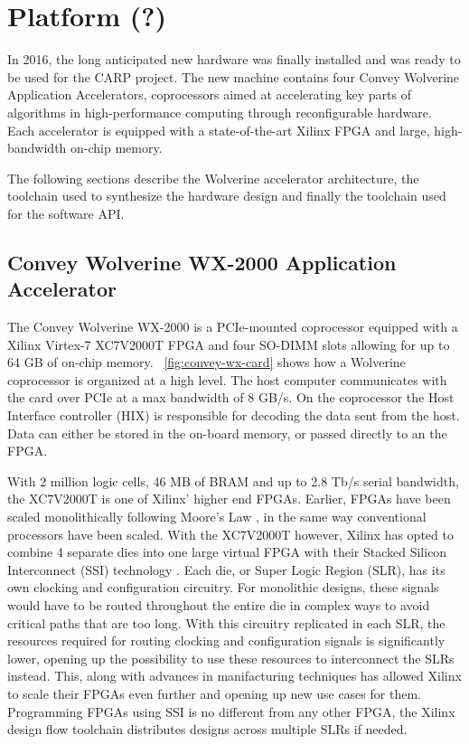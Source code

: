 
\chapter{Platform (?)}

In 2016, the long anticipated new hardware was finally installed and was ready
to be used for the CARP project. The new machine contains four Convey Wolverine
Application Accelerators, coprocessors aimed at accelerating key parts of
algorithms in high-performance computing through reconfigurable hardware. Each
accelerator is equipped with a state-of-the-art Xilinx FPGA and large,
high-bandwidth on-chip memory.

The following sections describe the Wolverine accelerator architecture, the
toolchain used to synthesize the hardware design and finally the toolchain used
for the software API.

\section{Convey Wolverine WX-2000 Application Accelerator}

The Convey Wolverine WX-2000 is a PCIe-mounted coprocessor equipped with a
Xilinx Virtex-7 XC7V2000T FPGA and four SO-DIMM slots allowing for up to 64 GB
of on-chip memory. \figurename~\ref{fig:convey-wx-card} shows how a Wolverine
coprocessor is organized at a high level. The host computer communicates with
the card over PCIe at a max bandwidth of 8 GB/s. On the coprocessor the Host
Interface controller (HIX) is responsible for decoding the data sent from the
host. Data can either be stored in the on-board memory, or passed directly to an
the FPGA.

With 2 million logic cells, 46 MB of BRAM and up to 2.8 Tb/s serial bandwidth,
the XC7V2000T is one of Xilinx' higher end FPGAs. Earlier, FPGAs have been
scaled monolithically following Moore's Law , in the same way
conventional processors have been scaled. With the XC7V2000T however, Xilinx has
opted to combine 4 separate dies into one large virtual FPGA with their Stacked
Silicon Interconnect (SSI) technology \cite{Saban2011}. Each die, or Super Logic
Region (SLR), has its own clocking and configuration circuitry. For monolithic
designs, these signals would have to be routed throughout the entire die in
complex ways to avoid critical paths that are too long. With this circuitry
replicated in each SLR, the resources required for routing clocking and
configuration signals is significantly lower, opening up the possibility to use
these resources to interconnect the SLRs instead. This, along with advances in
manifacturing techniques has allowed Xilinx to scale their FPGAs even further
and opening up new use cases for them. Programming FPGAs using SSI is no
different from any other FPGA, the Xilinx design flow toolchain distributes
designs across multiple SLRs if needed.


